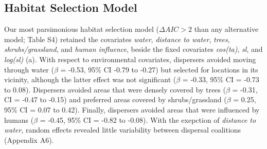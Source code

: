 \documentclass[abstract=on,10pt,a4paper,bibliography=totocnumbered]{article}
\begin{document}
\subsection{Habitat Selection Model}
Our most parsimonious habitat selection model (\(\Delta AIC > 2\) than any
alternative model; Table S4) retained the covariates \textit{water},
\textit{distance to water}, \textit{trees}, \textit{shrubs/grassland}, and
\textit{human influence}, beside the fixed covariates \textit{cos(ta)},
\textit{sl}, and \textit{log(sl)} (a). With respect to
environmental covariates, dispersers avoided moving through water (\(\beta\) =
-0.53, 95\% CI -0.79 to -0.27) but selected for locations in its vicinity,
although the latter effect was not significant (\(\beta\) = -0.33, 95\% CI =
-0.73 to 0.08). Dispersers avoided areas that were densely covered by trees
(\(\beta\) = -0.31, CI = -0.47 to -0.15) and preferred areas covered by
shrubs/grassland (\(\beta\) = 0.25, 95\% CI = 0.07 to 0.42). Finally, dispersers
avoided areas that were influenced by humans (\(\beta\) = -0.45, 95\% CI = -0.82
to -0.08). With the exepction of \textit{distance to water}, random effects
revealed little variability between dispersal coalitions (Appendix A6).

\end{document}
